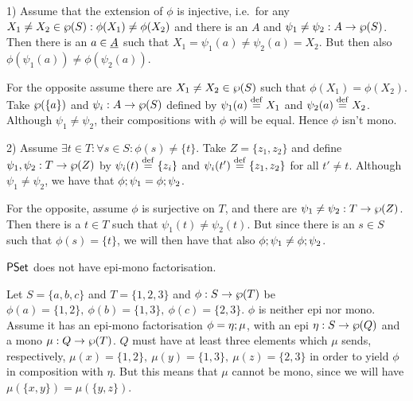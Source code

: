 \documentclass[10pt]{article}
\begin{document}
\begin{Proof}
1) Assume that the extension of $\phi$ is injective, i.e.\ for any
$X_1\not= X_2\in\wp(S): \phi(X_1)\not=\phi(X_2)$ and there is an $A$
and $\psi_1\not=\psi_2:A\rightarrow \wp(S)$.  Then there is an $a\in\underline {A}$ such that $X_1=\psi_1(a)\not=\psi_2(a)=X_2$. But then also
$\phi(\psi_1(a))\not=\phi(\psi_2(a))$.

For the opposite assume there are $X_1\not=X_2 \in\wp(S)$ such that
$\phi(X_1)=\phi(X_2)$.  Take $\wp(\{a\})$ and
$\psi_i:A\rightarrow\wp(S)$ defined by $\psi_1(a)\stackrel{{\rm \tiny{def}}}= X_1$ and
$\psi_2(a)\stackrel{{\rm \tiny{def}}}= X_2$.  Although $\psi_1\not=\psi_2$, their compositions
with $\phi$ will be equal. Hence $\phi$ isn't mono. 

2) Assume $\exists t\in T: \forall s\in S: \phi(s)\not=\{t\}$.  Take
$Z=\{z_1,z_2\}$ and define $\psi_1,\psi_2:T\rightarrow \wp(Z)$ by
$\psi_i(t)\stackrel{{\rm \tiny{def}}}=\{z_i\}$ and $\psi_i(t')\stackrel{{\rm \tiny{def}}}= \{z_1,z_2\}$ for all
$t'\not=t$. Although $\psi_1\not=\psi_2$, we have that
$\phi;\psi_1=\phi;\psi_2$.

For the opposite, assume $\phi$ is surjective on $T$, and there are
$\psi_1\not=\psi_2:T\rightarrow \wp(Z)$. Then there is a $t\in T$ such
that $\psi_1(t)\not=\psi_2(t)$. But since there is an $s\in S$ such
that $\phi(s)=\{t\}$, we will then have that also
$\phi;\psi_1\not=\phi;\psi_2$.
\end{Proof}

\begin{Lemma}
\label{le:noepi-mono}
$\mbox{\rm\sf PSet}$ does not have epi-mono factorisation.
\end{Lemma}

\begin{Proof}
Let $S=\{a,b,c\}$ and $T=\{1,2,3\}$ and $\phi:S\rightarrow\wp(T)$ be
$\phi(a)=\{1,2\},\ \phi(b)=\{1,3\},\ \phi(c)=\{2,3\}$. $\phi$ is
neither epi nor mono.  Assume it has an epi-mono factorisation
$\phi=\eta;\mu$, with an epi $\eta:S\rightarrow\wp(Q)$ and a mono
$\mu:Q\rightarrow\wp(T)$. $Q$ must have at least three elements which
$\mu$ sends, respectively, $\mu(x)=\{1,2\},\ \mu(y)=\{1,3\},\
\mu(z)=\{2,3\}$ in order to yield $\phi$ in composition with
$\eta$. But this means that $\mu$ cannot be mono, since we will have
$\mu(\{x,y\})=\mu(\{y,z\})$.
\end{Proof}

\end{document}
